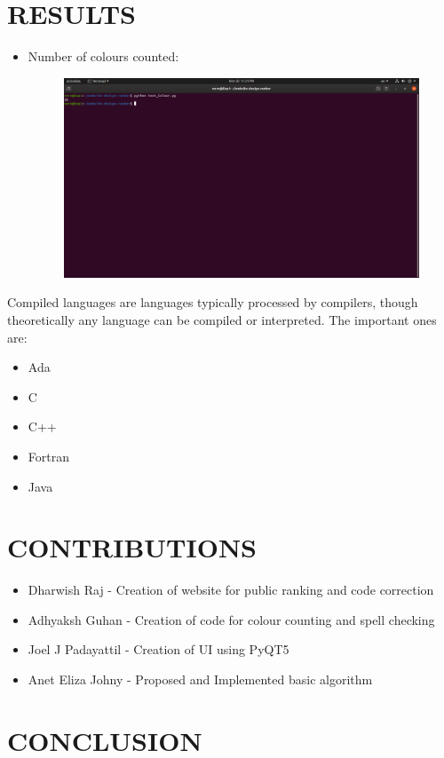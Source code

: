 \documentclass{fisatproject}
\begin{document}
\chapter{RESULTS}
	\begin{itemize}
		\item Number of colours counted:
	\begin{figure}[h]
		\includegraphics[scale=.3]{colourtest.png}
	\end{figure}
	\end{itemize}
Compiled languages are languages typically processed by compilers, though theoretically any language can be compiled or interpreted. The important ones are:
\begin{itemize}
\item Ada
\item C
\item C++
\item Fortran
\item Java
\end{itemize}

\chapter{CONTRIBUTIONS}
\begin{itemize}
	\item Dharwish Raj - Creation of website for public ranking and code correction
	\item Adhyaksh Guhan - Creation of code for colour counting and spell checking
	\item Joel J Padayattil - Creation of UI using PyQT5
	\item Anet Eliza Johny - Proposed and Implemented basic algorithm 
\end{itemize}
\chapter{CONCLUSION}
\end{document}
